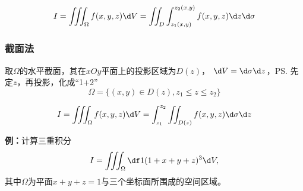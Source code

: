$${I=\iiint_{\Omega}f(x,y,z)\d
V=\iint_D\int_{z_1(x,y)}^{z_2(x,y)}f(x,y,z)\d z\d\sigma}$$

\subsubsection{截面法}

取$\Omega$的水平截面，其在$xOy$平面上的投影区域为$D(z)$，
$\d V=\d\sigma \d z$，\ps{先定$z$，再投影，化成“1+2”}
$$\Omega=\{(x,y)\in D(z),z_1\leq z\leq z_2\}$$

\begin{center}
\end{center}

$${I=\iiint_{\Omega}f(x,y,z)\d
V=\int_{z_1}^{z_2}\iint_{D(z)}f(x,y,z)\d\sigma \d z}$$

{\bf 例：}计算三重积分
$$I=\iiint_{\Omega}\df1{(1+x+y+z)^3}\d V,$$
其中$\Omega$为平面$x+y+z=1$与三个坐标面所围成的空间区域。

